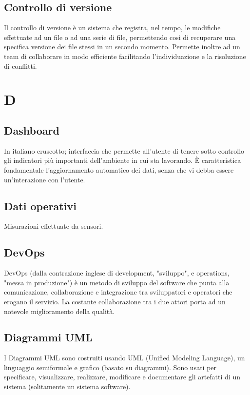 \subsection*{Controllo di versione}
Il controllo di versione è un sistema che registra, nel tempo, le modifiche effettuate ad un file o ad una serie di file, permettendo così di recuperare una specifica versione dei file stessi in un secondo momento.
Permette inoltre ad un team di collaborare in modo efficiente facilitando l'individuazione e la risoluzione di conflitti.

\clearpage
\section*{D}

\subsection*{Dashboard}
In italiano cruscotto; interfaccia che permette all'utente di tenere sotto controllo gli indicatori più importanti dell'ambiente in cui sta lavorando. È caratteristica fondamentale l'aggiornamento automatico dei dati, senza che vi debba essere un'interazione con l'utente.

\subsection*{Dati operativi}
Misurazioni effettuate da sensori.

\subsection*{DevOps}
DevOps (dalla contrazione inglese di development, "sviluppo", e operations, "messa in produzione") è un metodo di sviluppo del software che punta alla comunicazione, collaborazione e integrazione tra sviluppatori e operatori che erogano il servizio. La costante collaborazione tra i due attori porta ad un notevole miglioramento della qualità.

\subsection*{Diagrammi UML}
I Diagrammi UML sono costruiti usando UML (Unified Modeling Language), un linguaggio semiformale e grafico (basato su diagrammi). Sono usati per specificare, visualizzare, realizzare, modificare e documentare gli artefatti di un sistema (solitamente un sistema software).

